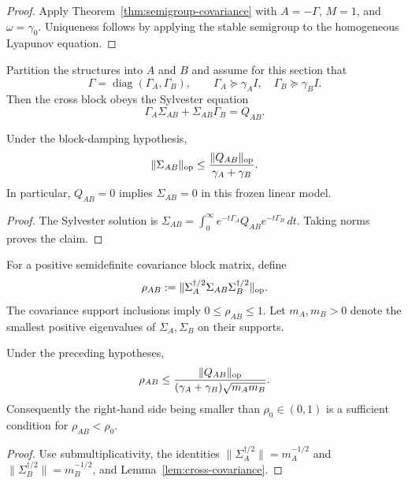 \documentclass[11pt]{article}
\begin{document}
\begin{proof}
Apply Theorem~\ref{thm:semigroup-covariance} with $A=-\Gamma$,
$M=1$, and $\omega=\gamma_0$. Uniqueness follows by applying the stable
semigroup to the homogeneous Lyapunov equation.
\end{proof}

Partition the structures into $A$ and $B$ and assume for this section that
\[
 \Gamma=\operatorname{diag}(\Gamma_A,\Gamma_B),\qquad
 \Gamma_A\succeq\gamma_A I,\quad
 \Gamma_B\succeq\gamma_B I.
\]
Then the cross block obeys the Sylvester equation
\[
 \Gamma_A\Sigma_{AB}+\Sigma_{AB}\Gamma_B=Q_{AB}.
\]

\begin{lemma}\label{lem:cross-covariance}
Under the block-damping hypothesis,
\[
 \|\Sigma_{AB}\|_{\rm op}
 \le \frac{\|Q_{AB}\|_{\rm op}}{\gamma_A+\gamma_B}.
\]
In particular, $Q_{AB}=0$ implies $\Sigma_{AB}=0$ in this frozen linear model.
\end{lemma}

\begin{proof}
The Sylvester solution is
$\Sigma_{AB}=\int_0^\infty e^{-t\Gamma_A}Q_{AB}e^{-t\Gamma_B}\,dt$.
Taking norms proves the claim.
\end{proof}

\begin{definition}\label{def:canonical}
For a positive semidefinite covariance block matrix, define
\[
 \rho_{AB}:=
 \|\Sigma_A^{\dagger/2}\Sigma_{AB}\Sigma_B^{\dagger/2}\|_{\rm op}.
\]
The covariance support inclusions imply $0\le\rho_{AB}\le1$. Let
$m_A,m_B>0$ denote the smallest positive eigenvalues of $\Sigma_A,\Sigma_B$
on their supports.
\end{definition}

\begin{theorem}\label{thm:canonical}
Under the preceding hypotheses,
\[
 \rho_{AB}
 \le
 \frac{\|Q_{AB}\|_{\rm op}}
 { (\gamma_A+\gamma_B)\sqrt{m_A m_B}}.
\]
Consequently the right-hand side being smaller than $\rho_0\in(0,1)$ is a
sufficient condition for $\rho_{AB}<\rho_0$.
\end{theorem}

\begin{proof}
Use submultiplicativity, the identities
$\|\Sigma_A^{\dagger/2}\|=m_A^{-1/2}$ and
$\|\Sigma_B^{\dagger/2}\|=m_B^{-1/2}$, and
Lemma~\ref{lem:cross-covariance}.
\end{proof}
\end{document}
